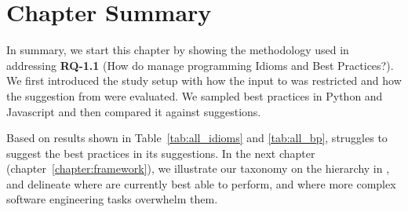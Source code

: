 \section{Chapter Summary}

In summary, we start this chapter by showing the methodology used in addressing \textbf{RQ-1.1} (How do \cct{} manage programming Idioms and Best Practices?). We first introduced the study setup with how the input to \cop{} was restricted and how the suggestion from \cop{} were evaluated. We sampled best practices in Python and Javascript and then compared it against \cop{} suggestions. 

Based on results shown in Table~\ref{tab:all_idioms} and \ref{tab:all_bp}, \cop{} struggles to suggest the best practices in its suggestions. In the next chapter (chapter~\ref{chapter:framework}), we illustrate our taxonomy on the hierarchy in \AISE{}, and delineate where \cct{} are currently best able to perform, and where more complex software engineering tasks overwhelm them.